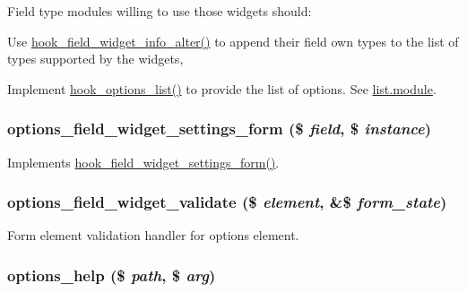 Field type modules willing to use those widgets should:
\begin{DoxyItemize}
\item Use \hyperlink{group__field__widget_ga2e74ac1b4b45e9f31b58b86d01892e7e}{hook\_\-field\_\-widget\_\-info\_\-alter()} to append their field own types to the list of types supported by the widgets,
\item Implement \hyperlink{options_8api_8php_aa25d7440810f3dc0c137ef0e5747b485}{hook\_\-options\_\-list()} to provide the list of options. See \hyperlink{list_8module}{list.module}. 
\end{DoxyItemize}\hypertarget{options_8module_a9be7905a9c57a7ce26a8c37dc441b446}{
\subsubsection[{options\_\-field\_\-widget\_\-settings\_\-form}]{\setlength{\rightskip}{0pt plus 5cm}options\_\-field\_\-widget\_\-settings\_\-form (\$ {\em field}, \/  \$ {\em instance})}}
\label{options_8module_a9be7905a9c57a7ce26a8c37dc441b446}
Implements \hyperlink{group__field__types_gabe5ece2134d0cbdfc3c4793f24c5866c}{hook\_\-field\_\-widget\_\-settings\_\-form()}. \hypertarget{options_8module_a7d411a2659add08a965e0892fe83787f}{
\subsubsection[{options\_\-field\_\-widget\_\-validate}]{\setlength{\rightskip}{0pt plus 5cm}options\_\-field\_\-widget\_\-validate (\$ {\em element}, \/  \&\$ {\em form\_\-state})}}
\label{options_8module_a7d411a2659add08a965e0892fe83787f}
Form element validation handler for options element. \hypertarget{options_8module_af1fe641e7ce3d6b9b177b6b0b6d9f79c}{
\subsubsection[{options\_\-help}]{\setlength{\rightskip}{0pt plus 5cm}options\_\-help (\$ {\em path}, \/  \$ {\em arg})}}
